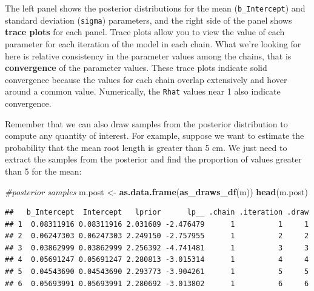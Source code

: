 \documentclass[
]{book}
\newenvironment{Shaded}{\begin{snugshade}}{\end{snugshade}}
\newcommand{\CommentTok}[1]{\textcolor[rgb]{0.56,0.35,0.01}{\textit{#1}}}
\newcommand{\DecValTok}[1]{\textcolor[rgb]{0.00,0.00,0.81}{#1}}
\newcommand{\FunctionTok}[1]{\textcolor[rgb]{0.13,0.29,0.53}{\textbf{#1}}}
\newcommand{\NormalTok}[1]{#1}
\newcommand{\OtherTok}[1]{\textcolor[rgb]{0.56,0.35,0.01}{#1}}
\newcommand{\SpecialCharTok}[1]{\textcolor[rgb]{0.81,0.36,0.00}{\textbf{#1}}}
\begin{document}
The left panel shows the posterior distributions for the mean (\texttt{b\_Intercept}) and standard deviation (\texttt{sigma}) parameters, and the right side of the panel shows \textbf{trace plots} for each panel. Trace plots allow you to view the value of each parameter for each iteration of the model in each chain. What we're looking for here is relative consistency in the parameter values among the chains, that is \textbf{convergence} of the parameter values. These trace plots indicate solid convergence because the values for each chain overlap extensively and hover around a common value. Numerically, the \texttt{Rhat} values near 1 also indicate convergence.

Remember that we can also draw samples from the posterior distribution to compute any quantity of interest. For example, suppose we want to estimate the probability that the mean root length is greater than 5 cm. We just need to extract the samples from the posterior and find the proportion of values greater than 5 for the mean:

\begin{Shaded}
\begin{Highlighting}[]
\CommentTok{\#posterior samples}
\NormalTok{m.post }\OtherTok{\textless{}{-}} \FunctionTok{as.data.frame}\NormalTok{(}\FunctionTok{as\_draws\_df}\NormalTok{(m))}
\FunctionTok{head}\NormalTok{(m.post)}
\end{Highlighting}
\end{Shaded}

\begin{verbatim}
##   b_Intercept  Intercept   lprior      lp__ .chain .iteration .draw
## 1  0.08311916 0.08311916 2.031689 -2.476479      1          1     1
## 2  0.06247303 0.06247303 2.249150 -2.757955      1          2     2
## 3  0.03862999 0.03862999 2.256392 -4.741481      1          3     3
## 4  0.05691247 0.05691247 2.280813 -3.015314      1          4     4
## 5  0.04543690 0.04543690 2.293773 -3.904261      1          5     5
## 6  0.05693991 0.05693991 2.280692 -3.013802      1          6     6
\end{verbatim}

\begin{Shaded}
\end{Shaded}
\end{document}
